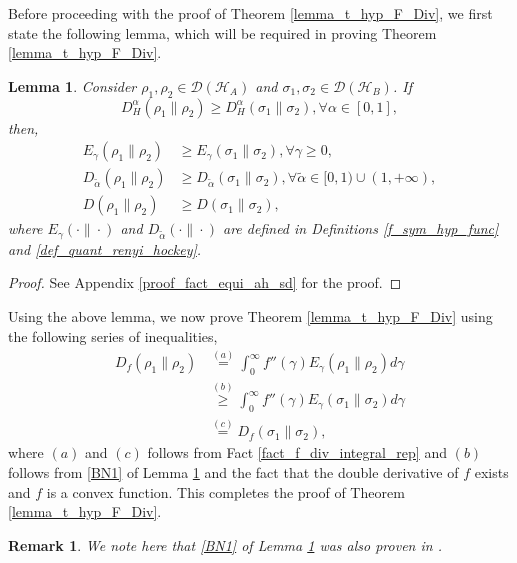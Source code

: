 \documentclass[onecolumn,ldraftcls, 11pt]{IEEEtran}
\newcommand{\nn}{\nonumber}
\newcommand*{\cH}{\mathcal{H}}
\newcommand*{\cD}{\mathcal{D}}
\newtheorem{remark}{Remark}
\newtheorem{lemma}{Lemma}
\begin{document}
    Before proceeding with the proof of Theorem \ref{lemma_t_hyp_F_Div}, we first state the following lemma, which will be required in proving Theorem \ref{lemma_t_hyp_F_Div}.
    \begin{lemma}\label{fact_equi_ah_sd}
        Consider $\rho_1,\rho_2 \in \cD(\cH_A)$ and $\sigma_1,\sigma_2 \in \cD(\cH_B)$. If
        \begin{equation}
            D^{\alpha}_{H}{(\rho_1\|\rho_2)} \geq D^{\alpha}_{H}{(\sigma_1\|\sigma_2)}, \forall \alpha \in [0,1],\label{fact_equi_ah_sd_eq}
        \end{equation}
        then,
\begin{align}
            E_{\gamma}(\rho_1\|\rho_2) &\geq E_{\gamma}(\sigma_1\|\sigma_2), \forall \gamma\geq 0, \label{BN1}\\
            D_{\tilde{\alpha}}(\rho_1\|\rho_2) &\geq D_{\tilde{\alpha}}(\sigma_1\|\sigma_2), \forall 
            \tilde{\alpha} \in [0,1) \cup (1,+\infty),\label{BN2} \\
            D(\rho_1\|\rho_2) &\geq D(\sigma_1\|\sigma_2),\label{BN2B}
        \end{align}
        where $E_{\gamma} (\cdot \|\cdot)$ 
        and $D_{\tilde{\alpha}}(\cdot \|\cdot)$
        are defined in Definitions \ref{f_sym_hyp_func} and \ref{def_quant_renyi_hockey}.
    \end{lemma}
    \begin{proof}
        See Appendix \ref{proof_fact_equi_ah_sd} for the proof.
    \end{proof}
    Using the above lemma, we now prove Theorem \ref{lemma_t_hyp_F_Div} using the following series of inequalities,
    \begin{align*}
        D_{f}(\rho_1\|\rho_2) &\overset{(a)}{=} \int_{0}^{\infty} f''(\gamma) E_{\gamma}(\rho_1\|\rho_2) d\gamma\nn\\
        &\overset{(b)}{\geq} \int_{0}^{\infty} f''(\gamma) E_{\gamma}(\sigma_1\|\sigma_2) d\gamma\nn\\
        &\overset{(c)}{=} D_{f}(\sigma_1\|\sigma_2),
    \end{align*}
    where $(a)$ and $(c)$ follows from Fact \ref{fact_f_div_integral_rep} and $(b)$ follows from \eqref{BN1} of Lemma \ref{fact_equi_ah_sd} and the fact that the double derivative of $f$ exists and $f$ is a convex function. This completes the proof of Theorem \ref{lemma_t_hyp_F_Div}. 


\begin{remark}
    We note here that \eqref{BN1} of Lemma \ref{fact_equi_ah_sd} was also proven in \cite[Theorem $2$]{BG17}.
\end{remark}
\end{document}
